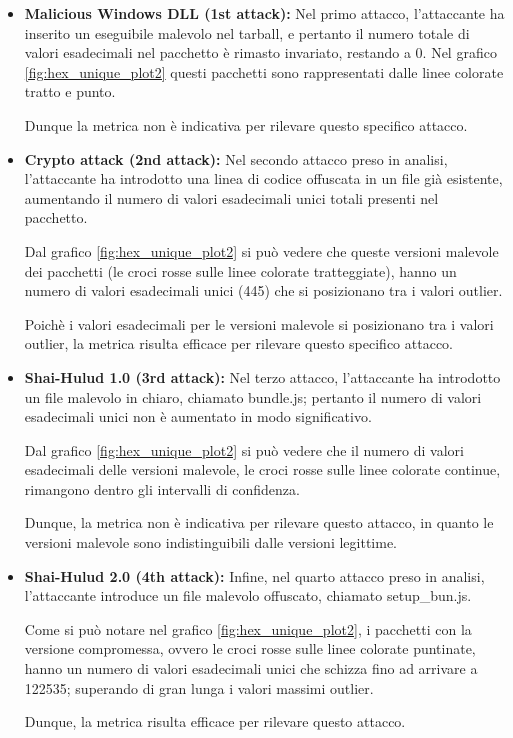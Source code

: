 \begin{itemize}
    \item \textbf{Malicious Windows DLL (1st attack):}
        Nel primo attacco, l'attaccante ha inserito un eseguibile malevolo nel tarball,
        e pertanto il numero totale di valori esadecimali nel pacchetto è rimasto invariato, restando a 0.
        Nel grafico \ref{fig:hex_unique_plot2} questi pacchetti sono 
        rappresentati dalle linee colorate tratto e punto.

        Dunque la metrica non è indicativa per rilevare questo specifico attacco.

    \item \textbf{Crypto attack (2nd attack):}
        Nel secondo attacco preso in analisi, l'attaccante ha introdotto una linea di codice 
        offuscata in un file già esistente, aumentando il numero di valori esadecimali unici totali presenti nel pacchetto.
        
        Dal grafico \ref{fig:hex_unique_plot2} si può vedere che 
        queste versioni malevole dei pacchetti (le croci rosse sulle linee colorate tratteggiate),
        hanno un numero di valori esadecimali unici (445) che
        si posizionano tra i valori outlier.
        
        Poichè i valori esadecimali per le versioni malevole si posizionano tra i valori outlier,
        la metrica risulta efficace per rilevare questo specifico attacco.
    
    \item \textbf{Shai-Hulud 1.0 (3rd attack):}   
        Nel terzo attacco, l'attaccante ha introdotto un file malevolo in chiaro, chiamato bundle.js;
        pertanto il numero di valori esadecimali unici non è aumentato in modo significativo.
        
        Dal grafico \ref{fig:hex_unique_plot2} si può vedere che
        il numero di valori esadecimali delle versioni malevole, le croci rosse sulle linee colorate continue, 
        rimangono dentro gli intervalli di confidenza.
        
        Dunque, la metrica non è indicativa per rilevare questo attacco,
        in quanto le versioni malevole sono indistinguibili dalle versioni legittime.
        
    \item \textbf{Shai-Hulud 2.0 (4th attack):}
        Infine, nel quarto attacco preso in analisi, 
        l'attaccante introduce un file malevolo offuscato, chiamato setup\_bun.js.

        Come si può notare nel grafico \ref{fig:hex_unique_plot2},
        i pacchetti con la versione compromessa, ovvero le croci rosse sulle linee colorate puntinate,
        hanno un numero di valori esadecimali unici che schizza fino ad arrivare a 122535; 
        superando di gran lunga i valori massimi outlier.

        Dunque, la metrica risulta efficace per rilevare questo attacco.

\end{itemize}

